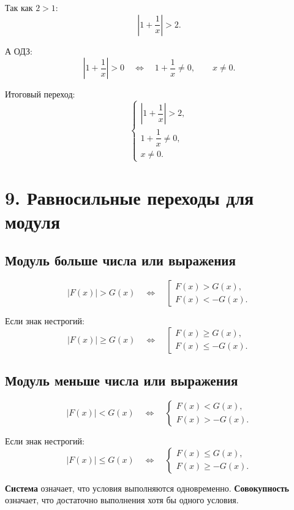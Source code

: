 \documentclass[a4paper,12pt]{article}
\newcommand{\sectionline}{\vspace{0.35em}{\color{accent}\hrule height 0.6pt}\vspace{0.65em}}
\newcommand{\important}[1]{\textcolor{darkaccent}{\textbf{#1}}}
\begin{document}
Так как $2>1$:
\[
\left|1+\frac1x\right|>2.
\]

А ОДЗ:
\[
\left|1+\frac1x\right|>0
\quad\Longleftrightarrow\quad
1+\frac1x\ne0,
\qquad x\ne0.
\]

Итоговый переход:
\[
\begin{cases}
\left|1+\dfrac1x\right|>2,\\[0.6em]
1+\dfrac1x\ne0,\\[0.4em]
x\ne0.
\end{cases}
\]

\section*{\textcolor{darkaccent}{9. Равносильные переходы для модуля}}
\sectionline

\subsection*{\textcolor{accent}{Модуль больше числа или выражения}}

\[
|F(x)|>G(x)
\quad\Longleftrightarrow\quad
\left[
\begin{array}{l}
F(x)>G(x),\\
F(x)<-G(x).
\end{array}
\right.
\]

Если знак нестрогий:
\[
|F(x)|\ge G(x)
\quad\Longleftrightarrow\quad
\left[
\begin{array}{l}
F(x)\ge G(x),\\
F(x)\le -G(x).
\end{array}
\right.
\]

\subsection*{\textcolor{accent}{Модуль меньше числа или выражения}}

\[
|F(x)|<G(x)
\quad\Longleftrightarrow\quad
\begin{cases}
F(x)<G(x),\\
F(x)>-G(x).
\end{cases}
\]

Если знак нестрогий:
\[
|F(x)|\le G(x)
\quad\Longleftrightarrow\quad
\begin{cases}
F(x)\le G(x),\\
F(x)\ge -G(x).
\end{cases}
\]

\important{Система} означает, что условия выполняются одновременно.  
\important{Совокупность} означает, что достаточно выполнения хотя бы одного условия.
\end{document}

